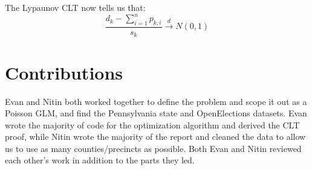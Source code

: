 \documentclass[10pt, letterpaper]{article}
\begin{document}
The Lypaunov CLT now tells us that: 
\[ \frac{d_k - \sum_{i = 1}^{n} p_{k, i} }{s_k} \stackrel{d} \longrightarrow N(0, 1) \] 

\newpage

\section{Contributions}
Evan and Nitin both worked together to define the problem and scope it out as a Poisson GLM, and find the Pennsylvania state and OpenElections datasets. Evan wrote the majority of code for the optimization algorithm and derived the CLT proof, while Nitin wrote the majority of the report and cleaned the data to allow us to use as many counties/precincts as possible. Both Evan and Nitin reviewed each other's work in addition to the parts they led.

{\small


}
\end{document}
